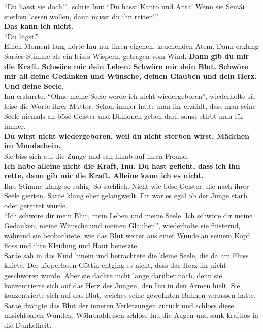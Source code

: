 ``Du hasst sie doch!'', schrie Inu: ``Du hasst Kanto und Anta! Wenn sie Semái sterben lassen 
wollen, dann musst du ihn retten!''\\
\textbf{Das kann ich nicht.}\\
``Du lügst.''\\
Einen Moment lang hörte Inu nur ihren eigenen, keuchenden Atem. Dann erklang Saráes Stimme als ein 
leises Wispern, getragen vom Wind. \textbf{Dann gib du mir die Kraft. Schwöre mir dein Leben. 
Schwöre mir dein Blut. Schwöre mir all deine Gedanken und Wünsche, deinen Glauben und dein Herz. 
Und deine Seele.}\\
Inu erstarrte. ``Ohne meine Seele werde ich nicht wiedergeboren'', wiederholte sie leise die Worte 
ihrer Mutter. Schon immer hatte man ihr erzählt, dass man seine Seele niemals an böse Geister und 
Dämonen geben darf, sonst stirbt man für immer.\\
\textbf{Du wirst nicht wiedergeboren, weil du nicht sterben wirst, Mädchen im Mondschein.}\\
Sie biss sich auf die Zunge und sah hinab auf ihren Freund. \\
\textbf{Ich habe alleine nicht die Kraft, Inu. Du hast gefleht, dass ich ihn rette, dann gib mir 
die Kraft. Alleine kann ich es nicht.}\\
Ihre Stimme klang so ruhig. So sachlich. Nicht wie böse Geister, die nach ihrer Seele gierten. 
Saráe klang eher gelangweilt. Ihr war es egal ob der Junge starb oder gerettet wurde.\\
``Ich schwöre dir mein Blut, mein Leben und meine Seele. Ich schwöre dir meine Gedanken, meine 
Wünsche und meinen Glauben'', wiederholte sie flüsternd, während sie beobachtete, wie das Blut 
weiter aus einer Wunde an seinem Kopf floss und ihre Kleidung und Haut benetzte.\\
Saráe sah in das Kind hinein und betrachtete die kleine Seele, die da am Fluss kniete. Der 
körperlosen Göttin entging es nicht, dass das Herz ihr nicht geschworen wurde. Aber sie dachte 
nicht lange darüber nach, denn sie konzentrierte sich auf das Herz des Jungen, den Inu in den Armen 
hielt. Sie konzentrierte sich auf das Blut, welches seine gewohnten Bahnen verlassen hatte. Saraé 
drängte das Blut der inneren Verletzungen zurück und schloss diese unsichtbaren Wunden. 
Währenddessen schloss Inu die Augen und sank kraftlos in die Dunkelheit. \\

